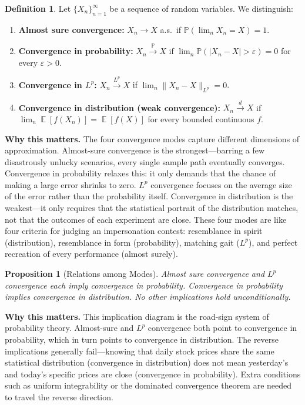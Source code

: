 \documentclass[11pt,a4paper,openany]{book}
\theoremstyle{definition}
\newtheorem{definition}{Definition}[chapter]
\theoremstyle{plain}
\newtheorem{proposition}[theorem]{Proposition}
\theoremstyle{remark}
\DeclareMathOperator{\E}{\mathbb{E}}
\newcommand{\1}{\mathbbm{1}}
\newcommand{\Pbb}{\mathbb{P}}
\begin{document}
\begin{definition}
Let $\{X_{n}\}_{n=1}^{\infty}$ be a sequence of random variables. We distinguish:
\begin{enumerate}[label=(\arabic*)]
    \item \textbf{Almost sure convergence:} $X_{n} \to X$ a.s.\ if $\Pbb(\lim_{n} X_{n} = X) = 1$.
    \item \textbf{Convergence in probability:} $X_{n} \xrightarrow{\Pbb} X$ if $\lim_{n} \Pbb(|X_{n} - X| > \varepsilon) = 0$ for every $\varepsilon > 0$.
    \item \textbf{Convergence in $L^{p}$:} $X_{n} \xrightarrow{L^{p}} X$ if $\lim_{n} \|X_{n} - X\|_{L^{p}} = 0$.
    \item \textbf{Convergence in distribution (weak convergence):} $X_{n} \xrightarrow{d} X$ if $\lim_{n} \E[f(X_{n})] = \E[f(X)]$ for every bounded continuous $f$.
\end{enumerate}
\end{definition}

\medskip
\noindent\textbf{Why this matters.} The four convergence modes capture different dimensions of approximation. Almost-sure convergence is the strongest---barring a few disastrously unlucky scenarios, every single sample path eventually converges. Convergence in probability relaxes this: it only demands that the chance of making a large error shrinks to zero. $L^{p}$ convergence focuses on the average size of the error rather than the probability itself. Convergence in distribution is the weakest---it only requires that the statistical portrait of the distribution matches, not that the outcomes of each experiment are close. These four modes are like four criteria for judging an impersonation contest: resemblance in spirit (distribution), resemblance in form (probability), matching gait ($L^{p}$), and perfect recreation of every performance (almost surely).

\begin{proposition}[Relations among Modes]
Almost sure convergence and $L^{p}$ convergence each imply convergence in probability. Convergence in probability implies convergence in distribution. No other implications hold unconditionally.
\end{proposition}

\medskip
\noindent\textbf{Why this matters.} This implication diagram is the road-sign system of probability theory. Almost-sure and $L^{p}$ convergence both point to convergence in probability, which in turn points to convergence in distribution. The reverse implications generally fail---knowing that daily stock prices share the same statistical distribution (convergence in distribution) does not mean yesterday's and today's specific prices are close (convergence in probability). Extra conditions such as uniform integrability or the dominated convergence theorem are needed to travel the reverse direction.
\end{document}
